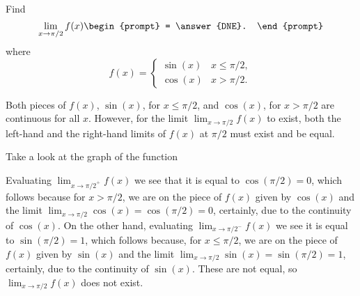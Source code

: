 \documentclass{ximera}
\author{Gregory Hartman \and Matthew Carr}
\begin{document}
\begin{exercise}




  Find 
  \[
  \lim_{x\to \pi/2} f(x)
  \begin{prompt}
  = \answer{DNE}.
  \end{prompt}
  \]
  where
  \[
  f(x) = \begin{cases}\sin(x) & x\leq \pi/2, \\ \cos(x) & x>\pi/2.
  \end{cases}
  \]
    \begin{hint}
     Both pieces of $f(x)$, $\sin(x)$, for $x\leq\pi/2$, and $\cos(x)$, for $x>\pi/2$ are continuous for all $x$. However, for the limit $\lim_{x\to\pi/2}f(x)$ to exist, both the left-hand and the right-hand limits of $f(x)$ at $\pi/2$ must exist and be equal.
    \end{hint}
     \begin{hint}
    	Take a look at the graph of the function
    \begin{center}
      \end{center} 
    \end{hint}
    \begin{hint}
     Evaluating $\lim_{x\to{\pi/2}^{+}}f(x)$ we see that it is equal to $\cos(\pi/2)=0$, which follows because for $x>\pi/2$, we are on the piece of $f(x)$ given by $\cos(x)$ and the limit $\lim_{x\to{\pi/2}}\cos(x)=\cos(\pi/2)=0$, certainly, due to the continuity of $\cos(x)$. On the other hand, evaluating $\lim_{x\to{\pi/2}^{-}}f(x)$ we see it is equal to $\sin(\pi/2)=1$, which follows because, for $x\leq\pi/2$, we are on the piece of $f(x)$ given by $\sin(x)$ and the limit $\lim_{x\to\pi/2}\sin(x)=\sin(\pi/2)=1$, certainly, due to the continuity of $\sin(x)$. These are not equal, so $\lim_{x\to\pi/2}f(x)$ does not exist.
    \end{hint}
\end{exercise}
\end{document}
